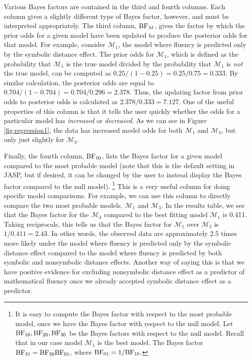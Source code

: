 \documentclass[english,,doc,floatsintext]{apa6}
\let\rmarkdownfootnote\footnote%
\def\footnote{\protect\rmarkdownfootnote}
\begin{document}
Various Bayes factors are contained in the third and fourth columns. Each column gives a slightly different type of Bayes factor, however, and must be interpreted appropriately. The third column, \(\textnormal{BF}_{M}\), gives the factor by which the prior odds for a given model have been updated to produce the posterior odds for that model. For example, consider \(\mathcal{M}_{1}\), the model where fluency is predicted only by the symbolic distance effect. The prior odds for \(\mathcal{M}_{1}\), which is defined as the probability that \(\mathcal{M}_{1}\) is the true model divided by the probability that \(\mathcal{M}_{1}\) is \emph{not} the true model, can be computed as \(0.25/(1-0.25) = 0.25/0.75 = 0.333\). By similar calculation, the posterior odds are equal to \(0.704/(1-0.704) = 0.704/0.296 = 2.378\). Thus, the updating factor from prior odds to posterior odds is calculated as \(2.378/0.333 = 7.127\). One of the useful properties of this column is that it tells the user quickly whether the odds for a particular model has \emph{increased} or \emph{decreased}. As we can see in Figure \ref{fig:regression1}, the data has increased model odds for both \(\mathcal{M}_{1}\) and \(\mathcal{M}_{3}\), but only just slightly for \(\mathcal{M}_{3}\).

Finally, the fourth column, \(\textnormal{BF}_{10}\), lists the Bayes factor for a given model compared to the most probable model (note that this is the default setting in JASP, but if desired, it can be changed by the user to instead display the Bayes factor compared to the null model).
\footnote{It is easy to compute the Bayes factor with respect to the most probable model, once we have the Bayes factor with respect to the null model. Let \( \textnormal{BF}_{10}, \textnormal{BF}_{20}, \textnormal{BF}_{30} \) be the Bayes factors with respect to the null model. Recall that in our case model \( \mathcal{M}_{1} \) is the best model. The Bayes factor \( \textnormal{BF}_{31} =\textnormal{BF}_{30} \textnormal{BF}_{01} \), where \( \textnormal{BF}_{01}= 1/\textnormal{BF}_{10} \).}
This is a very useful column for doing specific model comparisons. For example, we can use this column to directly compare the two most probable models, \(\mathcal{M}_{1}\) and \(\mathcal{M}_{3}\). In the results table, we see that the Bayes factor for the \(\mathcal{M}_{3}\) compared to the best fitting model \(\mathcal{M}_{1}\) is 0.411. Taking reciprocals, this tells us that the Bayes factor for \(\mathcal{M}_{1}\) over \(\mathcal{M}_{3}\) is \(1/0.411 = 2.43\). In other words, the observed data are approximately 2.5 times more likely under the model where fluency is predicted only by the symbolic distance effect compared to the model where fluency is predicted by both symbolic and nonsymbolic distance effects. Another way of saying this is that we have positive evidence for excluding nonsymbolic distance effect as a predictor of mathematical fluency once we already accepted symbolic distance effect as a predictor.
\end{document}
